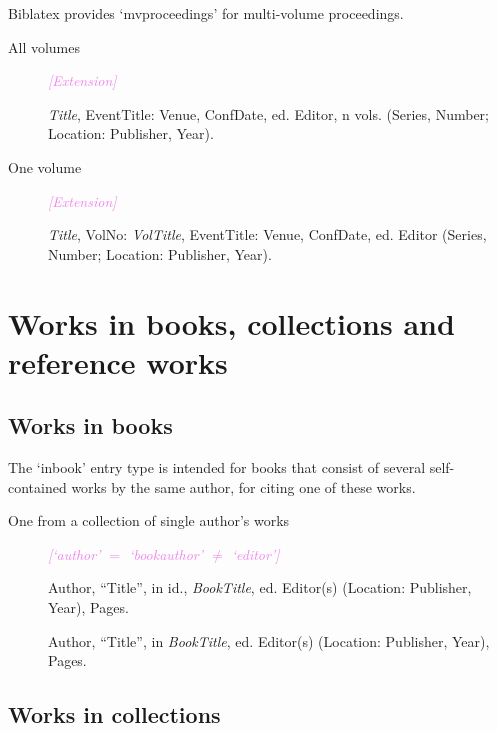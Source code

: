 \documentclass[extrafontsizes,11pt,a4paper,oneside]{memoir}
\newcommand*{\lit}[1]{\textsf{#1}}
\newcommand*{\code}[1]{`\textsf{#1}'}
\newcommand*{\aside}[1]{\textcolor{violet}{\emph{[#1]}}}
\begin{document}
Biblatex provides \code{mvproceedings} for multi-volume proceedings.

\begin{description}
  \item[All volumes] \aside{Extension}\par
  \emph{Title}, EventTitle: Venue, ConfDate, \lit{ed.} Editor, n \lit{vols.} (Series, Number; Location: Publisher, Year).
  \\
  
  \item[One volume] \aside{Extension}\par
  \emph{Title}, VolNo: \emph{VolTitle}, EventTitle: Venue, ConfDate, \lit{ed.} Editor (Series, Number; Location: Publisher, Year).
  \\
  
\end{description}

\section{Works in books, collections and reference works}\label{sec:inx}

\subsection{Works in books}

The \code{inbook} entry type is intended for books that consist of several self-contained works by the same author, for citing one of these works. 

\begin{description}
  \item[One from a collection of single author's works] \aside{\code{author} $=$ \code{bookauthor} $\neq$ \code{editor}}
  \par Author, \enquote{Title}, \lit{in id.}, \emph{BookTitle}, \lit{ed.} Editor(s) (Location: Publisher, Year), Pages.
  \\
  \par Author, \enquote{Title}, \lit{in} \emph{BookTitle}, \lit{ed.} Editor(s) (Location: Publisher, Year), Pages.
\end{description}

\subsection{Works in collections}
\end{document}

